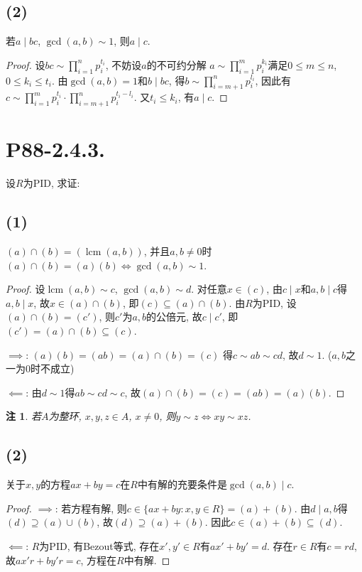 \documentclass[12pt, a4paper, fontset=windows]{ctexart}
\newcommand{\lcm}{\operatorname{lcm}}
\newtheorem*{remark}{注}
\begin{document}
\subsection*{(2)}

若$a\mid bc$, $\gcd(a,b)\sim 1$, 则$a\mid c$. 

\begin{proof}
设$bc\sim\prod^n_{i=1}p_i^{t_i}$, 不妨设$a$的不可约分解
$a\sim\prod^m_{i=1}p_i^{k_i}$满足$0\le m\le n$, 
$0\le k_i\le t_i$. 由$\gcd(a,b)=1$和$b\mid bc$, 
得$b\sim\prod^n_{i=m+1}p_i^{l_i}$, 因此有
$c\sim\prod^m_{i=1}p_i^{t_i}\cdot\prod^n_{i=m+1}p_i^{t_i-l_i}$. 
又$t_i\le k_i$, 有$a\mid c$. 
\end{proof}

\section*{P88-2.4.3.}

设$R$为PID, 求证: 

\subsection*{(1)}

$(a)\cap(b)=(\lcm(a,b))$, 并且$a,b\ne 0$时
$(a)\cap(b)=(a)(b)\iff\gcd(a,b)\sim 1$. 

\begin{proof}
设$\lcm(a,b)\sim c$, $\gcd(a,b)\sim d$. 对任意$x\in(c)$, 
由$c\mid x$和$a,b\mid c$得$a,b\mid x$, 
故$x\in(a)\cap(b)$, 即$(c)\subseteq(a)\cap(b)$. 
由$R$为PID, 设$(a)\cap(b)=(c')$, 则$c'$为$a,b$的公倍元, 
故$c\mid c'$, 即$(c')=(a)\cap(b)\subseteq(c)$. 

$\implies$: $(a)(b)=(ab)=(a)\cap(b)=(c)$
得$c\sim ab\sim cd$, 故$d\sim 1$. 
($a,b$之一为$0$时不成立) 

$\impliedby$: 由$d\sim 1$得$ab\sim cd\sim c$, 
故$(a)\cap(b)=(c)=(ab)=(a)(b)$. 
\end{proof}

\begin{remark}
若$A$为整环, $x,y,z\in A$, $x\ne 0$, 则$y\sim z\iff xy\sim xz$.  
\end{remark}

\subsection*{(2)}

关于$x,y$的方程$ax+by=c$在$R$中有解的充要条件是$\gcd(a,b)\mid c$. 

\begin{proof}
$\implies$: 若方程有解, 则$c\in\{ax+by:x,y\in R\}=(a)+(b)$. 
由$d\mid a,b$得$(d)\supseteq(a)\cup(b)$, 故$(d)\supseteq(a)+(b)$. 
因此$c\in(a)+(b)\subseteq(d)$. 

$\impliedby$: $R$为PID, 有Bezout等式, 存在$x',y'\in R$有$ax'+by'=d$. 
存在$r\in R$有$c=rd$, 故$ax'r+by'r=c$, 方程在$R$中有解. 
\end{proof}
\end{document}
